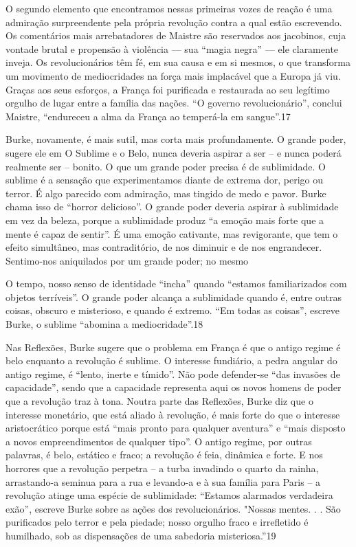  \par 
O segundo elemento que encontramos nessas primeiras vozes de reação é uma admiração surpreendente pela própria revolução contra a qual estão escrevendo. Os comentários mais arrebatadores de Maistre são reservados aos jacobinos, cuja vontade brutal e propensão à violência — sua “magia negra” — ele claramente inveja. Os revolucionários têm fé, em sua causa e em si mesmos, o que transforma um movimento de mediocridades na força mais implacável que a Europa já viu. Graças aos seus esforços, a França foi purificada e restaurada ao seu legítimo orgulho de lugar entre a família das nações. “O governo revolucionário”, conclui Maistre, “endureceu a alma da França ao temperá-la em sangue”.{\color{blue}17}
 \par 
Burke, novamente, é mais sutil, mas corta mais profundamente. O grande poder, sugere ele em O Sublime e o Belo, nunca deveria aspirar a ser – e nunca poderá realmente ser – bonito. O que um grande poder precisa é de sublimidade. O sublime é a sensação que experimentamos diante de extrema dor, perigo ou terror. É algo parecido com admiração, mas tingido de medo e pavor. Burke chama isso de “horror delicioso”. O grande poder deveria aspirar à sublimidade em vez da beleza, porque a sublimidade produz “a emoção mais forte que a mente é capaz de sentir”. É uma emoção cativante, mas revigorante, que tem o efeito simultâneo, mas contraditório, de nos diminuir e de nos engrandecer. Sentimo-nos aniquilados por um grande poder; no mesmo
 \par 
O tempo, nosso senso de identidade “incha” quando “estamos familiarizados com objetos terríveis”. O grande poder alcança a sublimidade quando é, entre outras coisas, obscuro e misterioso, e quando é extremo. “Em todas as coisas”, escreve Burke, o sublime “abomina a mediocridade”.{\color{blue}18}
 \par 
Nas Reflexões, Burke sugere que o problema em França é que o antigo regime é belo enquanto a revolução é sublime. O interesse fundiário, a pedra angular do antigo regime, é “lento, inerte e tímido”. Não pode defender-se “das invasões de capacidade”, sendo que a capacidade representa aqui os novos homens de poder que a revolução traz à tona. Noutra parte das Reflexões, Burke diz que o interesse monetário, que está aliado à revolução, é mais forte do que o interesse aristocrático porque está “mais pronto para qualquer aventura” e “mais disposto a novos empreendimentos de qualquer tipo”. O antigo regime, por outras palavras, é belo, estático e fraco; a revolução é feia, dinâmica e forte. E nos horrores que a revolução perpetra – a turba invadindo o quarto da rainha, arrastando-a seminua para a rua e levando-a e à sua família para Paris – a revolução atinge uma espécie de sublimidade: “Estamos alarmados verdadeira exão”, escreve Burke sobre as ações dos revolucionários. "Nossas mentes. . . São purificados pelo terror e pela piedade; nosso orgulho fraco e irrefletido é humilhado, sob as dispensações de uma sabedoria misteriosa.”{\color{blue}19}

